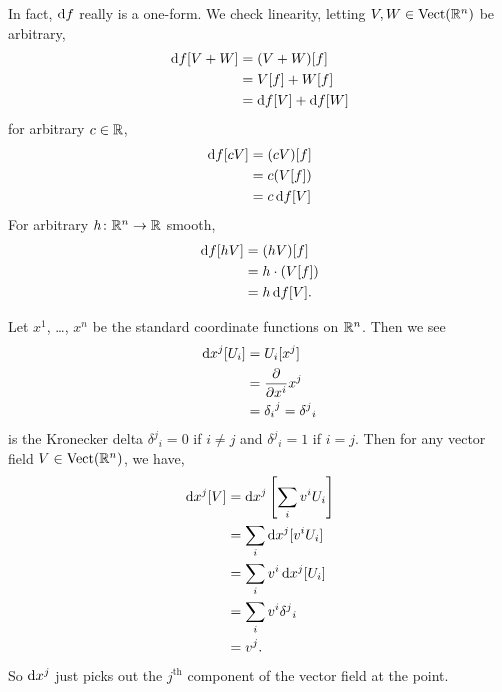 In fact, $\mathrm{d} f$ really is a one-form. We check linearity, letting
$V,W\in\operatorname{Vect}(\mathbb{R}^{n})$ be arbitrary,
\begin{subequations}
\begin{align}
  \mathrm{d} f[V + W] &= (V+W)[f]\\
  &= V[f] + W[f]\\
  &= \mathrm{d} f[V] + \mathrm{d} f[W]
\end{align}
\end{subequations}
for arbitrary $c\in\mathbb{R}$,
\begin{subequations}
  \begin{align}
    \mathrm{d} f[c V] &= (c V)[f]\\
    &= c(V[f])\\
    &= c\,\mathrm{d} f[V]
\end{align}
\end{subequations}
For arbitrary $h\colon\mathbb{R}^{n}\to\mathbb{R}$ smooth,
\begin{subequations}
\begin{align}
\mathrm{d} f[h V] &= (h V)[f]\\
&= h \cdot (V [f])\\
&= h\,\mathrm{d} f[V].
\end{align}
\end{subequations}

\begin{example}
Let $x^{1}$, \dots, $x^{n}$ be the standard coordinate functions on
$\mathbb{R}^{n}$. Then we see
\begin{subequations}
\begin{align}
  \mathrm{d} x^{j}[U_{i}] &= U_{i}[x^{j}]\\
  &= \frac{\partial}{\partial x^{i}}x^{j}\\
  &= {\delta_{i}}^{j} = {\delta^{j}}_{i}
\end{align}
\end{subequations}
is the Kronecker delta ${\delta^{j}}_{i}=0$ if $i\neq j$ and
${\delta^{j}}_{i}=1$ if $i=j$. Then for any vector field $V\in\operatorname{Vect}(\mathbb{R}^{n})$,
we have,
\begin{subequations}
\begin{align}
\mathrm{d} x^{j}[V] &= \mathrm{d} x^{j}\left[\sum_{i}v^{i}U_{i}\right]\\
&= \sum_{i}\mathrm{d} x^{j}[v^{i}U_{i}]\\
&= \sum_{i} v^{i}\,\mathrm{d} x^{j}[U_{i}]\\
&= \sum_{i} v^{i}{\delta^{j}}_{i}\\
&= v^{j}.
\end{align}
\end{subequations}
So $\mathrm{d} x^{j}$ just picks out the $j^{\text{th}}$ component of the vector
field at the point.
\end{example}

